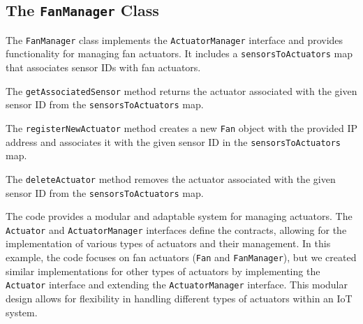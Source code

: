 \documentclass[parskip=full]{report}
\begin{document}
		\subsection{The \texttt{FanManager} Class}
		
		The \texttt{FanManager} class implements the \texttt{ActuatorManager} interface and provides functionality for managing fan actuators. It includes a \texttt{sensorsToActuators} map that associates sensor IDs with fan actuators.
		
		The \texttt{getAssociatedSensor} method returns the actuator associated with the given sensor ID from the \texttt{sensorsToActuators} map.
		
		The \texttt{registerNewActuator} method creates a new \texttt{Fan} object with the provided IP address and associates it with the given sensor ID in the \texttt{sensorsToActuators} map.
		
		The \texttt{deleteActuator} method removes the actuator associated with the given sensor ID from the \texttt{sensorsToActuators} map.
		
		The code provides a modular and adaptable system for managing actuators. The \texttt{Actuator} and \texttt{ActuatorManager} interfaces define the contracts, allowing for the implementation of various types of actuators and their management. In this example, the code focuses on fan actuators (\texttt{Fan} and \texttt{FanManager}), but we created similar implementations for other types of actuators by implementing the \texttt{Actuator} interface and extending the \texttt{ActuatorManager} interface. This modular design allows for flexibility in handling different types of actuators within an IoT system.
\end{document}
